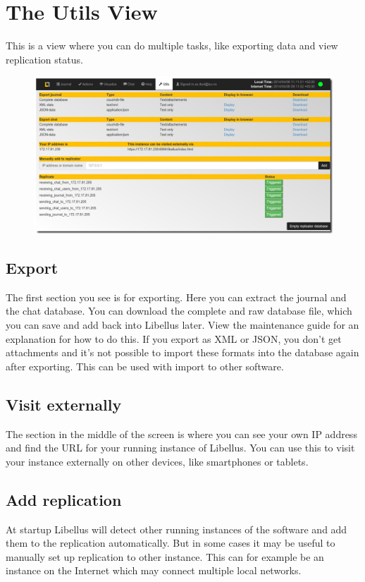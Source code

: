 \documentclass[letterpaper,10pt,english]{sphinxmanual}
\begin{document}
\section{The Utils View}
\label{User manual:the-utils-view}
This is a view where you can do multiple tasks, like exporting data and view replication status.
\begin{figure}[htbp]
\centering

\includegraphics{utils.png}
\end{figure}


\subsection{Export}
\label{User manual:export}
The first section you see is for exporting. Here you can extract the journal and the chat database. You can download the complete and raw database file, which you can save and add back into Libellus later. View the maintenance guide for an explanation for how to do this. If you export as XML or JSON, you don’t get attachments and it’s not possible to import these formats into the database again after exporting. This can be used with import to other software.


\subsection{Visit externally}
\label{User manual:visit-externally}
The section in the middle of the screen is where you can see your own IP address and find the URL for your running instance of Libellus. You can use this to visit your instance externally on other devices, like smartphones or tablets.


\subsection{Add replication}
\label{User manual:add-replication}
At startup Libellus will detect other running instances of the software and add them to the replication automatically. But in some cases it may be useful to manually set up replication to other instance. This can for example be an instance on the Internet which may connect multiple local networks.
\end{document}

